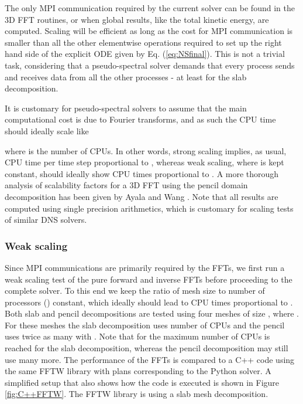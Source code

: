 \documentclass[final,3p,times,twocolumn]{elsarticle}
\begin{document}
The only MPI communication required by the current solver can be found in the 3D
FFT routines, or when global results, like the total kinetic energy, are
computed. Scaling will be efficient as long as the cost for MPI
communication is smaller than all the other elementwise operations required
to set up the right hand side of the explicit ODE given by Eq.
(\ref{eq:NSfinal}). This is not a trivial task, considering that a 
pseudo-spectral solver demands that every process sends and receives data
from all the other processes - at least for the slab decomposition.

It is customary for pseudo-spectral solvers to assume that the main computational cost is due to Fourier transforms, and as such the CPU time should ideally scale like


where  is the number of CPUs. In other words, strong scaling implies, as 
usual, CPU time per time step proportional to , whereas weak scaling, 
where  is kept constant, should ideally show CPU times proportional to 
. A more thorough analysis of scalability factors for a 3D FFT using 
the pencil domain decomposition has been given by Ayala and Wang 
\cite{ayala2013}. Note that all results are computed using single precision 
arithmetics, which is customary for scaling tests of similar DNS solvers. 

\subsubsection{Weak scaling}
Since MPI communications are primarily required by the FFTs, we first run a 
weak scaling test of the pure forward and inverse FFTs before proceeding to the 
complete solver. To this end we keep the ratio of mesh size to number of 
processors () constant, which ideally should lead to CPU times 
proportional to . Both slab and pencil decompositions are tested 
using four meshes of size , where . For these meshes the slab decomposition uses 
 number of CPUs and the pencil uses twice as many  with .
Note that for  the maximum number of CPUs is reached for the slab decomposition, whereas the pencil
decomposition may still use many more. The performance of the FFTs is compared 
to a C++ code using the same FFTW library with plans corresponding to the 
Python solver. A simplified setup that also shows how the code is executed is 
shown in Figure \ref{fig:C++FFTW}. The FFTW library is using a slab mesh 
decomposition.
\end{document}
